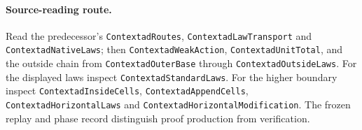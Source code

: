 \documentclass[11pt]{article}
\begin{document}
\paragraph{Source-reading route.}
Read the predecessor's \texttt{ContextadRoutes}, \texttt{ContextadLawTransport} and
\texttt{ContextadNativeLaws}; then \texttt{ContextadWeakAction},
\texttt{ContextadUnitTotal}, and the outside chain from \texttt{ContextadOuterBase}
through \texttt{ContextadOutsideLaws}. For the displayed laws inspect
\texttt{ContextadStandardLaws}. For the higher boundary inspect
\texttt{ContextadInsideCells}, \texttt{ContextadAppendCells},
\texttt{ContextadHorizontalLaws} and \texttt{ContextadHorizontalModification}.
The frozen replay and phase record distinguish proof production from verification.
\end{document}
